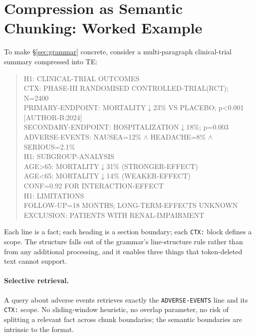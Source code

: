 \documentclass{article}
\newcommand{\teDown}{\ensuremath{\downarrow}}
\newcommand{\teAnd}{\ensuremath{\wedge}}
\begin{document}



\appendix

\section{Compression as Semantic Chunking: Worked Example}
\label{app:semantic-chunking}

To make \S\ref{sec:grammar} concrete, consider a multi-paragraph clinical-trial summary compressed into TE:

\begin{quote}\small\ttfamily
H1: CLINICAL-TRIAL OUTCOMES \\
CTX: PHASE-III RANDOMISED CONTROLLED-TRIAL(RCT); N=2400 \\
\hspace*{1em} PRIMARY-ENDPOINT: MORTALITY\teDown{}23\% VS PLACEBO; p<0.001 [AUTHOR-B:2024] \\
\hspace*{1em} SECONDARY-ENDPOINT: HOSPITALIZATION\teDown{}18\%; p=0.003 \\
\hspace*{1em} ADVERSE-EVENTS: NAUSEA=12\% \teAnd{} HEADACHE=8\% \teAnd{} SERIOUS=2.1\% \\
H1: SUBGROUP-ANALYSIS \\
\hspace*{1em} AGE>65: MORTALITY\teDown{}31\% (STRONGER-EFFECT) \\
\hspace*{1em} AGE<65: MORTALITY\teDown{}14\% (WEAKER-EFFECT) \\
\hspace*{1em} CONF=0.92 FOR INTERACTION-EFFECT \\
H1: LIMITATIONS \\
\hspace*{1em} FOLLOW-UP=18 MONTHS; LONG-TERM-EFFECTS UNKNOWN \\
\hspace*{1em} EXCLUSION: PATIENTS WITH RENAL-IMPAIRMENT
\end{quote}

Each line is a fact; each heading is a section boundary; each \texttt{CTX:} block defines a scope. The structure falls out of the grammar's line-structure rule rather than from any additional processing, and it enables three things that token-deleted text cannot support.

\paragraph{Selective retrieval.} A query about adverse events retrieves exactly the \texttt{ADVERSE-EVENTS} line and its \texttt{CTX:} scope. No sliding-window heuristic, no overlap parameter, no risk of splitting a relevant fact across chunk boundaries; the semantic boundaries are intrinsic to the format.
\end{document}
